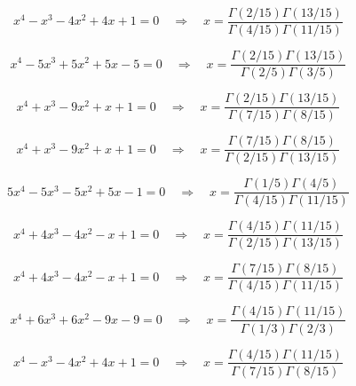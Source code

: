 \documentclass[11pt,a4paper]{article}
\begin{document}
\begin{equation}\label{eq:107}
x^{4} - x^{3} - 4x^{2} + 4x + 1 = 0 \quad \Rightarrow \quad x = \frac{\Gamma(2/15)\Gamma(13/15)}{\Gamma(4/15)\Gamma(11/15)}
\end{equation}

\begin{equation}\label{eq:108}
x^{4} - 5x^{3} + 5x^{2} + 5x - 5 = 0 \quad \Rightarrow \quad x = \frac{\Gamma(2/15)\Gamma(13/15)}{\Gamma(2/5)\Gamma(3/5)}
\end{equation}

\begin{equation}\label{eq:109}
x^{4} + x^{3} - 9x^{2} + x + 1 = 0 \quad \Rightarrow \quad x = \frac{\Gamma(2/15)\Gamma(13/15)}{\Gamma(7/15)\Gamma(8/15)}
\end{equation}

\begin{equation}\label{eq:110}
x^{4} + x^{3} - 9x^{2} + x + 1 = 0 \quad \Rightarrow \quad x = \frac{\Gamma(7/15)\Gamma(8/15)}{\Gamma(2/15)\Gamma(13/15)}
\end{equation}

\begin{equation}\label{eq:111}
5x^{4} - 5x^{3} - 5x^{2} + 5x - 1 = 0 \quad \Rightarrow \quad x = \frac{\Gamma(1/5)\Gamma(4/5)}{\Gamma(4/15)\Gamma(11/15)}
\end{equation}

\begin{equation}\label{eq:112}
x^{4} + 4x^{3} - 4x^{2} - x + 1 = 0 \quad \Rightarrow \quad x = \frac{\Gamma(4/15)\Gamma(11/15)}{\Gamma(2/15)\Gamma(13/15)}
\end{equation}

\begin{equation}\label{eq:113}
x^{4} + 4x^{3} - 4x^{2} - x + 1 = 0 \quad \Rightarrow \quad x = \frac{\Gamma(7/15)\Gamma(8/15)}{\Gamma(4/15)\Gamma(11/15)}
\end{equation}

\begin{equation}\label{eq:114}
x^{4} + 6x^{3} + 6x^{2} - 9x - 9 = 0 \quad \Rightarrow \quad x = \frac{\Gamma(4/15)\Gamma(11/15)}{\Gamma(1/3)\Gamma(2/3)}
\end{equation}

\begin{equation}\label{eq:115}
x^{4} - x^{3} - 4x^{2} + 4x + 1 = 0 \quad \Rightarrow \quad x = \frac{\Gamma(4/15)\Gamma(11/15)}{\Gamma(7/15)\Gamma(8/15)}
\end{equation}
\end{document}
